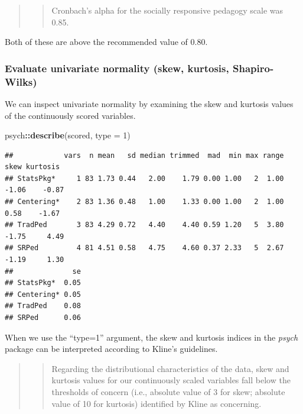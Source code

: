 \documentclass[
  11pt,
]{book}
\newenvironment{Shaded}{\begin{snugshade}}{\end{snugshade}}
\newcommand{\AttributeTok}[1]{\textcolor[rgb]{0.27,0.27,0.27}{#1}}
\newcommand{\DecValTok}[1]{\textcolor[rgb]{0.06,0.06,0.06}{#1}}
\newcommand{\FunctionTok}[1]{\textcolor[rgb]{0.27,0.27,0.27}{\textbf{#1}}}
\newcommand{\NormalTok}[1]{#1}
\newcommand{\SpecialCharTok}[1]{\textcolor[rgb]{0.43,0.43,0.43}{\textbf{#1}}}
\begin{document}
\begin{quote}
\begin{quote}
Cronbach's alpha for the socially responsive pedagogy scale was 0.85.
\end{quote}
\end{quote}

Both of these are above the recommended value of 0.80.

\hypertarget{evaluate-univariate-normality-skew-kurtosis-shapiro-wilks}{%
\subsubsection*{Evaluate univariate normality (skew, kurtosis, Shapiro-Wilks)}\label{evaluate-univariate-normality-skew-kurtosis-shapiro-wilks}}


We can inspect univariate normality by examining the skew and kurtosis values of the continuously scored variables.

\begin{Shaded}
\begin{Highlighting}[]
\NormalTok{psych}\SpecialCharTok{::}\FunctionTok{describe}\NormalTok{(scored, }\AttributeTok{type =} \DecValTok{1}\NormalTok{)}
\end{Highlighting}
\end{Shaded}

\begin{verbatim}
##            vars  n mean   sd median trimmed  mad  min max range  skew kurtosis
## StatsPkg*     1 83 1.73 0.44   2.00    1.79 0.00 1.00   2  1.00 -1.06    -0.87
## Centering*    2 83 1.36 0.48   1.00    1.33 0.00 1.00   2  1.00  0.58    -1.67
## TradPed       3 83 4.29 0.72   4.40    4.40 0.59 1.20   5  3.80 -1.75     4.49
## SRPed         4 81 4.51 0.58   4.75    4.60 0.37 2.33   5  2.67 -1.19     1.30
##              se
## StatsPkg*  0.05
## Centering* 0.05
## TradPed    0.08
## SRPed      0.06
\end{verbatim}

When we use the ``type=1'' argument, the skew and kurtosis indices in the \emph{psych} package can be interpreted according to Kline's \citeyearpar{kline_data_2016} guidelines.

\begin{quote}
\begin{quote}
Regarding the distributional characteristics of the data, skew and kurtosis values for our continuously scaled variables fall below the thresholds of concern (i.e., absolute value of 3 for skew; absolute value of 10 for kurtosis) identified by Kline \citeyearpar{kline_data_2016} as concerning.
\end{quote}
\end{quote}
\end{document}
